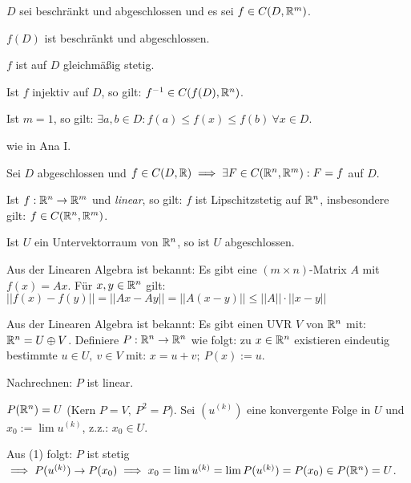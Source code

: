 \documentclass[a4paper,twoside,DIV15,BCOR12mm,chapterprefix=true,headings=twolinechapter]{scrbook}
\begin{document}
\begin{satz}
$D$ sei beschränkt und abgeschlossen und es sei $f \in C(D,\mathbb{R}^m)$.
\begin{liste}
\item $f(D)$ ist beschränkt und abgeschlossen.
\item $f$ ist auf $D$ gleichmäßig stetig.
\item Ist $f$ injektiv auf $D$, so gilt: $f^{-1} \in C(f(D),\mathbb{R}^n)$.
\item Ist $m = 1$, so gilt: $\exists a,b \in D: f(a) \le f(x) \le f(b)\ \forall x \in D$.
\end{liste}
\end{satz}

\begin{beweis}
wie in Ana I.
\end{beweis}

\begin{satz}
Sei $D$ abgeschlossen und $f \in C(D,\mathbb{R}) \implies \exists F \in C(\mathbb{R}^n,\mathbb{R}^m): F=f$ auf $D$.
\end{satz}

\begin{satz}
\begin{liste}
\item Ist $f:\mathbb{R}^n \to \mathbb{R}^m$ und \emph{linear}, so gilt: $f$ ist Lipschitzstetig auf $\mathbb{R}^n$, insbesondere gilt: $f \in C(\mathbb{R}^n,\mathbb{R}^m)$.
\item Ist $U$ ein Untervektorraum von $\mathbb{R}^n$, so ist $U$ abgeschlossen.
\end{liste}
\end{satz}

\begin{beweise}
\item Aus der Linearen Algebra ist bekannt: Es gibt eine $(m \times n)$-Matrix $A$ mit $f(x) = Ax$. Für $x,y \in \mathbb{R}^n$ gilt: $||f(x)-f(y)|| = ||Ax - Ay|| = ||A(x-y)|| \le ||A||\cdot ||x-y||$

\item Aus der Linearen Algebra ist bekannt: Es gibt einen UVR $V$ von $\mathbb{R}^n$ mit: $\mathbb{R}^n = U \oplus V$. Definiere $P: \mathbb{R}^n \to \mathbb{R}^n$ wie folgt: zu $x \in \mathbb{R}^n$ existieren eindeutig bestimmte $u \in U,\ v \in V$ mit: $x = u+v;\ P(x) := u$.

Nachrechnen: $P$ ist linear.

$P(\mathbb{R}^n) = U$ (Kern $P = V,\ P^2 = P$). Sei $(u^{(k)})$ eine konvergente Folge in $U$ und $x_0 := \lim u^{(k)}$, z.z.: $x_0 \in U$.

Aus (1) folgt: $P$ ist stetig $\implies P(u^{(k)}) \to P(x_0) \implies x_0 = \lim u^{(k)} = \lim P(u^{(k)}) = P(x_0) \in P(\mathbb{R}^n) = U$.
\end{beweise}
\end{document}
